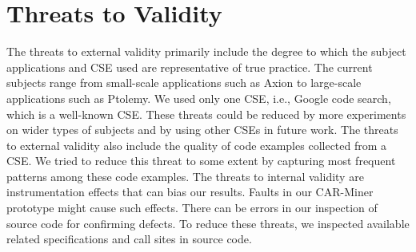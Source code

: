 \section{Threats to Validity}
\label{sec:threats}
The threats to external validity primarily include the degree
to which the subject applications and CSE used are representative of true practice. 
The current subjects range from small-scale applications such as Axion
to large-scale applications such as Ptolemy. We used
only one CSE, i.e., Google code search, which is a well-known CSE. These threats could
be reduced by more experiments on wider types of subjects and by using
other CSEs in future work. The threats to external validity also
include the quality of code examples collected from a CSE. We tried to 
reduce this threat to some extent by capturing most frequent patterns among
these code examples. The threats to internal validity are
instrumentation effects that can bias our results. Faults in
our CAR-Miner prototype might cause such effects. There can be errors
in our inspection of source code for confirming defects. To reduce these
threats, we inspected available related specifications and call sites
in source code.